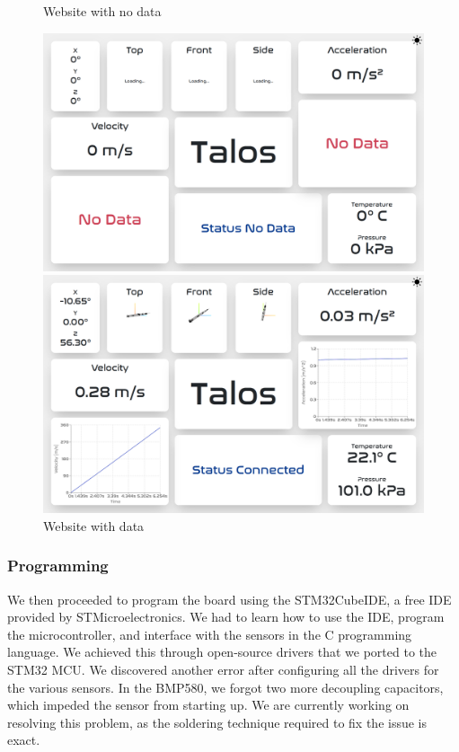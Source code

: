 \documentclass{article}
\begin{document}
\begin{figure}[h]
      \caption{Website with no data}
      \label{fig:website_no_data}
      \centering
      \includegraphics[width=\textwidth]{website_no_data.png}
      \caption{Website with data}
      \label{fig:website_data}
      \includegraphics[width=\textwidth]{website_data.png}
\end{figure}
\subsubsection{Programming}
We then proceeded to program the board using the STM32CubeIDE, a free IDE provided by STMicroelectronics\cite{STM32CubeIDE}. We had to learn how to use the IDE, program the microcontroller, and interface with the sensors in the C programming language. We achieved this through open-source drivers that we ported to the STM32 MCU. We discovered another error after configuring all the drivers for the various sensors. In the BMP580, we forgot two more decoupling capacitors, which impeded the sensor from starting up. We are currently working on resolving this problem, as the soldering technique required to fix the issue is exact.
\end{document}
